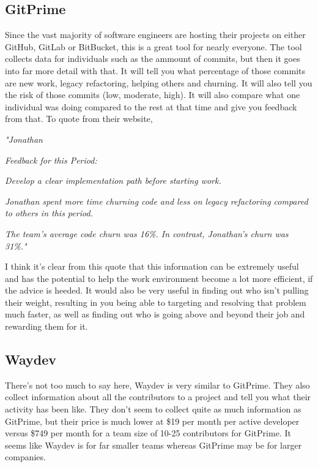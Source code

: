 \documentclass[12pt]{report}
\begin{document}
\subsection{GitPrime}
Since the vast majority of software engineers are hosting their projects on either GitHub, GitLab or BitBucket, this is a great tool for nearly everyone. The tool collects data for individuals such as the ammount of commits, but then it goes into far more detail with that. It will tell you what percentage of those commits are new work, legacy refactoring, helping others and churning. It will also tell you the risk of those commits (low, moderate, high). It will also compare what one individual was doing compared to the rest at that time and give you feedback from that. To quote from their website, 
\begin{center}
\textit{
"Jonathan} \par
\textit{Feedback for this Period:} \par
\textit{Develop a clear implementation path before starting work.} \newline \par
\textit{Jonathan spent more time churning code and less on legacy refactoring compared to others in this period.} \newline \par
\textit{The team's average code churn was 16\%. In contrast, Jonathan's churn was 31\%."}
\end{center}
I think it's clear from this quote that this information can be extremely useful and has the potential to help the work environment become a lot more efficient, if the advice is heeded. It would also be very useful in finding out who isn't pulling their weight, resulting in you being able to targeting and resolving that problem much faster, as well as finding out who is going above and beyond their job and rewarding them for it.

\subsection{Waydev}
There's not too much to say here, Waydev is very similar to GitPrime. They also collect information about all the contributors to a project and tell you what their activity has been like. They don't seem to collect quite as much information as GitPrime, but their price is much lower at \$19 per month per active developer versus \$749 per month for a team size of 10-25 contributors for GitPrime. It seems like Waydev is for far smaller teams whereas GitPrime may be for larger companies.
\end{document}
